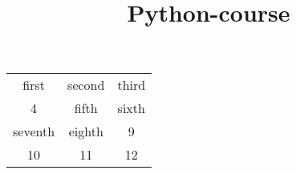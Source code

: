 \documentclass{article}
\title{Python-course}
\begin{document}
\maketitle
\begin{center}
\begin{tabular}{c c c }
first & second & third \\
4 & fifth & sixth \\
seventh & eighth & 9 \\
10 & 11 & 12 \\

\end{tabular}
\end{center}
\end{document}
